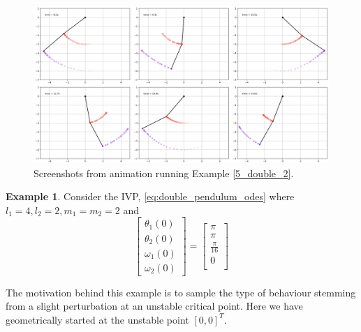 \documentclass[12pt, twoside]{report}
\theoremstyle{plain}
\theoremstyle{definition}
\theoremstyle{definition}
\newtheorem{example}{Example}[chapter]
\begin{document}
            \begin{figure}
                \centering
                    \includegraphics[width=\columnwidth]{double_2}
                    \caption{Screenshots from animation running Example 
                    \ref{5_double_2}.}
                    \label{5_d2}
            \end{figure}

            \begin{example}
                \label{5_double_3}
                Consider the IVP, \eqref{eq:double_pendulum_odes} where 
                $l_1=4, l_2=2, m_1=m_2=2$ and
                \begin{equation}
                    \begin{bmatrix}
                        \theta_1(0)\\
                        \theta_2(0)\\
                        \omega_1(0)\\
                        \omega_2(0)
                    \end{bmatrix}
                    = 
                    \begin{bmatrix}
                        \pi\\ \pi\\ \frac{\pi}{16}\\ 0\\
                    \end{bmatrix}
                \label{eq:double_ics_3}
                \end{equation}

                The motivation behind this example is to sample the type of
                behaviour stemming from a slight perturbation at an unstable
                critical point. Here we have geometrically started at the
                unstable point $[0, 0]^T$. 
            \end{example}
\end{document}
